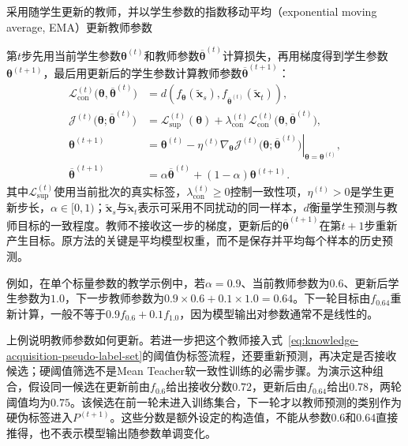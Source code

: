 采用随学生更新的教师，并以学生参数的指数移动平均（exponential moving average, EMA）更新教师参数

第$t$步先用当前学生参数$\bm{\theta}^{(t)}$和教师参数$\overline{\bm{\theta}}^{(t)}$计算损失，再用梯度得到学生参数$\bm{\theta}^{(t+1)}$，最后用更新后的学生参数计算教师参数$\overline{\bm{\theta}}^{(t+1)}$：
\begin{equation}
  \begin{aligned}
    \mathcal{L}_{\mathrm{con}}^{(t)}
      \bigl(\bm{\theta},\overline{\bm{\theta}}^{(t)}\bigr)
    &=
    d\!\left(
      f_{\bm{\theta}}(\widetilde{\bm{x}}_s),
      f_{\overline{\bm{\theta}}^{(t)}}(\widetilde{\bm{x}}_t)
    \right), \\
    \mathcal{J}^{(t)}
      \bigl(\bm{\theta};\overline{\bm{\theta}}^{(t)}\bigr)
    &=
    \mathcal{L}_{\mathrm{sup}}^{(t)}(\bm{\theta})
    +\lambda_{\mathrm{con}}^{(t)}
      \mathcal{L}_{\mathrm{con}}^{(t)}
      \bigl(\bm{\theta},\overline{\bm{\theta}}^{(t)}\bigr), \\
    \bm{\theta}^{(t+1)}
    &=
    \bm{\theta}^{(t)}
    -\eta^{(t)}
      \left.
      \nabla_{\bm{\theta}}\mathcal{J}^{(t)}
      \bigl(\bm{\theta};\overline{\bm{\theta}}^{(t)}\bigr)
      \right|_{\bm{\theta}=\bm{\theta}^{(t)}}, \\
    \overline{\bm{\theta}}^{(t+1)}
    &=
    \alpha\overline{\bm{\theta}}^{(t)}
    +(1-\alpha)\bm{\theta}^{(t+1)}.
  \end{aligned}
  \label{eq:knowledge-acquisition-mean-teacher}
\end{equation}
其中$\mathcal{L}_{\mathrm{sup}}^{(t)}$使用当前批次的真实标签，$\lambda_{\mathrm{con}}^{(t)}\geq0$控制一致性项，$\eta^{(t)}>0$是学生更新步长，$\alpha\in[0,1)$；$\widetilde{\bm{x}}_s$与$\widetilde{\bm{x}}_t$表示可采用不同扰动的同一样本，$d$衡量学生预测与教师目标的一致程度。教师不接收这一步的梯度，更新后的$\overline{\bm{\theta}}^{(t+1)}$在第$t+1$步重新产生目标。原方法的关键是平均模型权重，而不是保存并平均每个样本的历史预测。

例如，在单个标量参数的教学示例中，若$\alpha=0.9$、当前教师参数为$0.6$、更新后学生参数为$1.0$，下一步教师参数为$0.9\times0.6+0.1\times1.0=0.64$。下一轮目标由$f_{0.64}$重新计算，一般不等于$0.9f_{0.6}+0.1f_{1.0}$，因为模型输出对参数通常不是线性的。

上例说明教师参数如何更新。若进一步把这个教师接入式~\eqref{eq:knowledge-acquisition-pseudo-label-set}的阈值伪标签流程，还要重新预测，再决定是否接收候选；硬阈值筛选不是Mean Teacher软一致性训练的必需步骤。为演示这种组合，假设同一候选在更新前由$f_{0.6}$给出接收分数$0.72$，更新后由$f_{0.64}$给出$0.78$，两轮阈值均为$0.75$。该候选在前一轮未进入训练集合，下一轮才以教师预测的类别作为硬伪标签进入$P^{(t+1)}$。这些分数是额外设定的构造值，不能从参数$0.6$和$0.64$直接推得，也不表示模型输出随参数单调变化。

